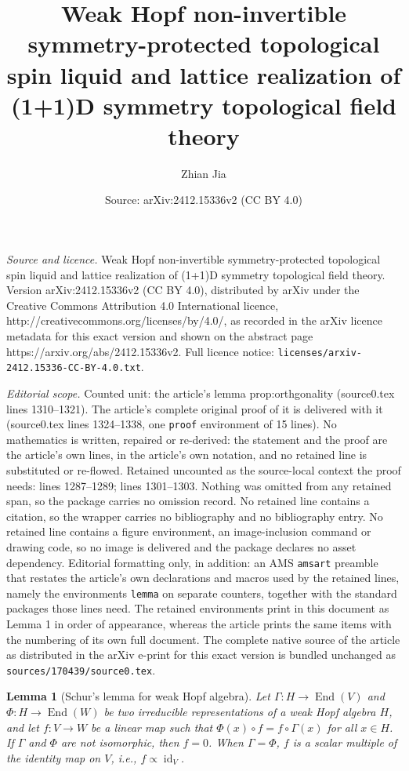 \documentclass[10pt,a4paper]{amsart}
\title{\fontsize{15pt}{15pt}Weak Hopf non-invertible symmetry-protected topological spin liquid and lattice realization of (1+1)D symmetry topological field theory}
\author{Zhian Jia}
\date{Source: arXiv:2412.15336v2 (CC BY 4.0)}
\newtheorem{lemma}{Lemma}
\newcommand{\End}{\operatorname{End}}
\newcommand{\id}{\operatorname{id}}
\begin{document}
\maketitle

\noindent\emph{Source and licence.} \fontsize{15pt}{15pt}Weak Hopf non-invertible symmetry-protected topological spin liquid and lattice realization of (1+1)D symmetry topological field theory. Version arXiv:2412.15336v2 (CC BY 4.0), distributed by arXiv under the Creative Commons Attribution 4.0 International licence, http://creativecommons.org/licenses/by/4.0/, as recorded in the arXiv licence metadata for this exact version and shown on the abstract page https://arxiv.org/abs/2412.15336v2. Full licence notice: \texttt{licenses/arxiv-2412.15336-CC-BY-4.0.txt}.\par\smallskip

\noindent\textit{Editorial scope.} Counted unit: the article's lemma prop:orthgonality (source0.tex lines 1310--1321). The article's complete original proof of it is delivered with it (source0.tex lines 1324--1338, one \texttt{proof} environment of 15 lines). No mathematics is written, repaired or re-derived: the statement and the proof are the article's own lines, in the article's own notation, and no retained line is substituted or re-flowed.  Retained uncounted as the source-local context the proof needs: lines 1287--1289; lines 1301--1303.  Nothing was omitted from any retained span, so the package carries no omission record.  No retained line contains a citation, so the wrapper carries no bibliography and no bibliography entry.  No retained line contains a figure environment, an image-inclusion command or drawing code, so no image is delivered and the package declares no asset dependency.  Editorial formatting only, in addition: an AMS \texttt{amsart} preamble that restates the article's own declarations and macros used by the retained lines, namely the environments \texttt{lemma} on separate counters, together with the standard packages those lines need.  The retained environments print in this document as Lemma 1 in order of appearance, whereas the article prints the same items with the numbering of its own full document.  The complete native source of the article as distributed in the arXiv e-print for this exact version is bundled unchanged as \texttt{sources/170439/source0.tex}.
\begin{lemma}[Schur's lemma for weak Hopf algebra]\label{prop:schur} 
Let $\Gamma: H \to \End(V)$ and $\Phi: H \to \End(W)$ be two irreducible representations of a weak Hopf algebra $H$, and let $f: V \to W$ be a linear map such that $\Phi(x) \circ f = f \circ \Gamma(x)$ for all $x \in H$. If $\Gamma$ and $\Phi$ are not isomorphic, then $f = 0$. When $\Gamma= \Phi$, $f$ is a scalar multiple of the identity map on $V$, i.e., $f \propto \id_V$. 
\end{lemma}
\end{document}
